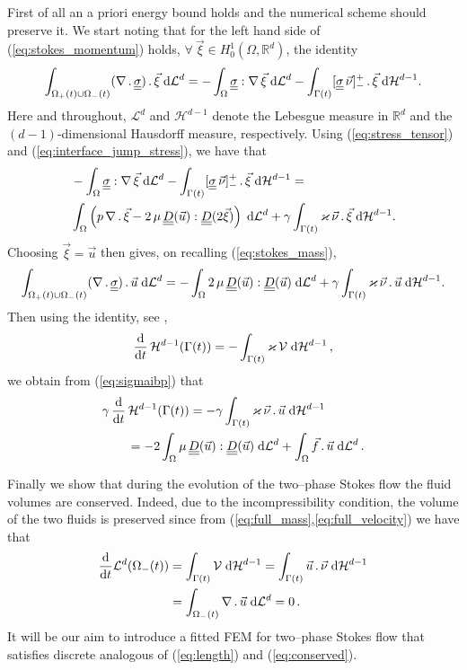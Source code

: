 \documentclass[a4paper,12pt,onecolumn]{article}
\newcommand{\R}{{\mathbb R}}
\newcommand{\vol}{\mathcal{L}^d}
\newcommand{\dH}[1]{\;{\rm d}{\cal H}^{#1}} %
\newcommand{\dL}[1]{\;{\rm d}{\cal L}^{#1}} %
\newcommand{\ddt}{\frac{\rm d}{{\rm d}t}}
\newcommand{\mat}[1]{\underline{\underline{#1}}\rule{0pt}{0pt}}
\begin{document}
First of all an a priori energy bound holds and the numerical scheme should preserve it. We start noting that for the left hand side of (\ref{eq:stokes_momentum}) holds, $\forall \ \vec \xi \in H^1_0(\Omega, \R^d)$, the identity 
\begin{equation}\label{eq:weak_stress_tensor}
\int_{\Omega_+(t)\cup\Omega_-(t)} (\nabla\,.\,\mat\sigma)\,.\, \vec \xi \dL{d}  = - \int_{\Omega} \mat\sigma : \nabla\,\vec \xi \dL{d}
- \int_{\Gamma(t)} [\mat\sigma\,\vec\nu]_-^+\, . \,\vec \xi  \dH{d-1}.
\end{equation}
Here and throughout, $\mathcal{L}^d$ and $\mathcal{H}^{d-1}$ denote the Lebesgue measure in $\R^d$ and the $(d-1)$-dimensional Hausdorff measure, respectively. Using (\ref{eq:stress_tensor}) and (\ref{eq:interface_jump_stress}), we have that
\begin{align}
& - \int_{\Omega} \mat\sigma : \nabla\,\vec \xi \dL{d} - \int_{\Gamma(t)} [\mat\sigma\,\vec\nu]_-^+\, . \,\vec \xi  \dH{d-1} = \nonumber\\
&\int_{\Omega} \left( p\,\nabla\,.\,\vec \xi -2\,\mu\,\mat D(\vec u) : \mat D(2\vec \xi) \right) \dL{d} + \gamma \int_{\Gamma(t)} \varkappa\,\vec \nu \,.\, \vec \xi \dH{d-1}.
\end{align}
Choosing $\vec \xi=\vec u$ then gives, on recalling (\ref{eq:stokes_mass}),
\begin{equation}\label{eq:sigmaibp}
\int_{\Omega_+(t)\cup\Omega_-(t)} (\nabla\,.\,\mat\sigma)\,.\, \vec u \dL{d} = -\int_{\Omega} 2\,\mu\,\mat D(\vec u) : \mat D(\vec u) \dL{d} + \gamma \int_{\Gamma(t)} \varkappa\,\vec \nu \,.\, \vec u \dH{d-1}.
\end{equation}
 Then using the identity, see \cite[Lemma~2.1]{DeckelnickDE05}, 
\begin{equation}\label{eq:dtarea}
\ddt\,\mathcal{H}^{d-1}(\Gamma(t)) = -\int_{\Gamma(t)} \varkappa\,\mathcal{V} \dH{d-1} \,, 
\end{equation}
we obtain from (\ref{eq:sigmaibp}) that
\begin{align}
& \gamma\,\ddt\,\mathcal{H}^{d-1}(\Gamma(t)) = -\gamma \int_{\Gamma(t)} \varkappa\,\vec \nu \,.\,\vec u \dH{d-1} \nonumber\\
& \qquad =-2\int_\Omega\mu\, \mat D(\vec u):\mat D(\vec u) \dL{d} +\int_\Omega \vec f\,.\, \vec u \dL{d}\,.\label{eq:length}
\end{align}

Finally we show that during the evolution of the two--phase Stokes flow the fluid volumes are conserved. Indeed, due to the incompressibility condition, the volume of the two fluids is preserved since from (\ref{eq:full_mass},\ref{eq:full_velocity}) we have that
\begin{align}
\ddt \vol(\Omega_-(t)) & = \int_{\Gamma(t)} \mathcal{V}\dH{d-1}=\int_{\Gamma(t)}\vec u\,.\,\vec\nu \dH{d-1} \nonumber \\ 
& = \int_{\Omega_-(t)} \nabla\,.\,\vec u \dL{d} =0\,. \label{eq:conserved}
\end{align}
It will be our aim to introduce a fitted FEM for two--phase Stokes flow that satisfies discrete analogous of (\ref{eq:length}) and (\ref{eq:conserved}).
\end{document}
